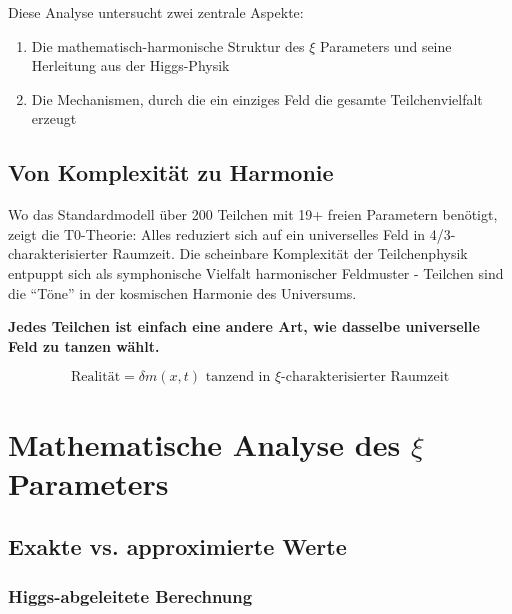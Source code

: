 	Diese Analyse untersucht zwei zentrale Aspekte:
	\begin{enumerate}
		\item Die mathematisch-harmonische Struktur des $\xi$ Parameters und seine Herleitung aus der Higgs-Physik
		\item Die Mechanismen, durch die ein einziges Feld die gesamte Teilchenvielfalt erzeugt
	\end{enumerate}
	
	\subsection{Von Komplexität zu Harmonie}
	\label{subsec:von-komplexitaet-zu-harmonie}
	
	Wo das Standardmodell über 200 Teilchen mit 19+ freien Parametern benötigt, zeigt die T0-Theorie: Alles reduziert sich auf ein universelles Feld in 4/3-charakterisierter Raumzeit. Die scheinbare Komplexität der Teilchenphysik entpuppt sich als symphonische Vielfalt harmonischer Feldmuster - Teilchen sind die ``Töne'' in der kosmischen Harmonie des Universums.
	
	\begin{tcolorbox}[colback=blue!5!white,colframe=blue!75!black,title=Zentrales T0-Prinzip]
		\textbf{Jedes Teilchen ist einfach eine andere Art, wie dasselbe universelle Feld zu tanzen wählt.}
		
		\begin{equation}
			\boxed{\text{Realität} = \delta m(x,t) \text{ tanzend in } \xi \text{-charakterisierter Raumzeit}}
			\label{eq:fundamentale_realitaet}
		\end{equation}
	\end{tcolorbox}
	
	\section{Mathematische Analyse des $\xi$ Parameters}
	\label{sec:xi_analyse}
	
	\subsection{Exakte vs. approximierte Werte}
	\label{subsec:exakt_vs_approximiert}
	
	\subsubsection{Higgs-abgeleitete Berechnung}
	\label{subsubsec:higgs_berechnung}
	
